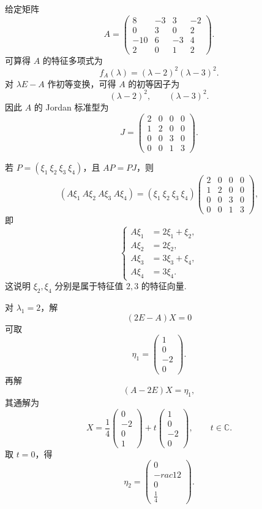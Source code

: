 \begin{example}
	给定矩阵
	\[
	A=
	\begin{pmatrix}
		8&-3&3&-2\\
		0&3&0&2\\
		-10&6&-3&4\\
		2&0&1&2
	\end{pmatrix}.
	\]
	可算得 $A$ 的特征多项式为
	\[
	f_A(\lambda)=(\lambda-2)^2(\lambda-3)^2.
	\]
	对 $\lambda E-A$ 作初等变换，可得 $A$ 的初等因子为
	\[
	(\lambda-2)^2,
	\qquad
	(\lambda-3)^2.
	\]
	因此 $A$ 的 Jordan 标准型为
	\[
	J=
	\begin{pmatrix}
		2&0&0&0\\
		1&2&0&0\\
		0&0&3&0\\
		0&0&1&3
	\end{pmatrix}.
	\]
	
	若 $P=(\xi_1\ \xi_2\ \xi_3\ \xi_4)$，且 $AP=PJ$，则
	\[
	(A\xi_1\ A\xi_2\ A\xi_3\ A\xi_4)
	=(\xi_1\ \xi_2\ \xi_3\ \xi_4)
	\begin{pmatrix}
		2&0&0&0\\
		1&2&0&0\\
		0&0&3&0\\
		0&0&1&3
	\end{pmatrix},
	\]
	即
	\[
	\left\{
	\begin{aligned}
		A\xi_1&=2\xi_1+\xi_2,\\
		A\xi_2&=2\xi_2,\\
		A\xi_3&=3\xi_3+\xi_4,\\
		A\xi_4&=3\xi_4.
	\end{aligned}
	\right.
	\]
	这说明 $\xi_2,\xi_4$ 分别是属于特征值 $2,3$ 的特征向量.
	
	对 $\lambda_1=2$，解
	\[
	(2E-A)X=0
	\]
	可取
	\[
	\eta_1=
	\begin{pmatrix}
		1\\0\\-2\\0
	\end{pmatrix}.
	\]
	再解
	\[
	(A-2E)X=\eta_1,
	\]
	其通解为
	\[
	X=\frac14
	\begin{pmatrix}
		0\\-2\\0\\1
	\end{pmatrix}
	+t
	\begin{pmatrix}
		1\\0\\-2\\0
	\end{pmatrix},
	\qquad t\in\mathbb{C}.
	\]
	取 $t=0$，得
	\[
	\eta_2=
	\begin{pmatrix}
		0\\-rac12\\0\\\frac14
	\end{pmatrix}.
	\]
	

\end{example}
